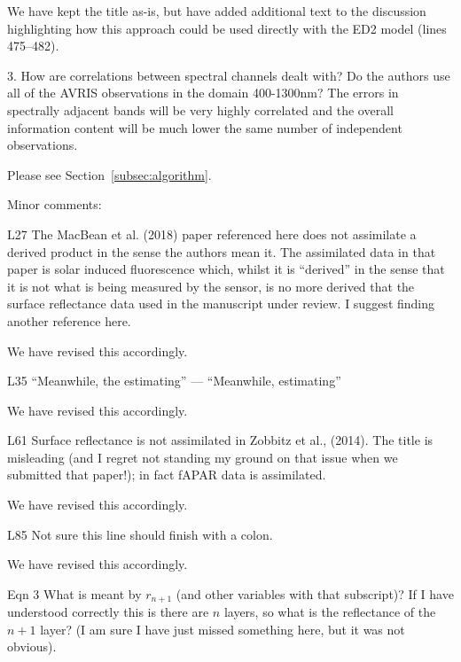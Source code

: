 We have kept the title as-is, but have added additional text to the discussion highlighting how this approach could be used directly with the ED2 model (lines 475--482).

\begin{reviewer}
  3. How are correlations between spectral channels dealt with? Do the authors use all of the AVRIS observations in the domain 400-1300nm? The errors in spectrally adjacent bands will be very highly correlated and the overall information content will be much lower the same number of independent observations.
\end{reviewer}

Please see Section~\ref{subsec:algorithm}.

\begin{reviewer}
Minor comments:

L27 The MacBean et al. (2018) paper referenced here does not assimilate a derived product in the sense the authors mean it. The assimilated data in that paper is solar induced fluorescence which, whilst it is “derived” in the sense that it is not what is being measured by the sensor, is no more derived that the surface reflectance data used in the manuscript under review. I suggest finding another reference here.
\end{reviewer}

We have revised this accordingly.

\begin{reviewer}
L35 “Meanwhile, the estimating” --- “Meanwhile, estimating”
\end{reviewer}

We have revised this accordingly.

\begin{reviewer}
L61 Surface reflectance is not assimilated in Zobbitz et al., (2014). The title is misleading (and I regret not standing my ground on that issue when we submitted that paper!); in fact fAPAR data is assimilated.
\end{reviewer}

We have revised this accordingly.

\begin{reviewer}
L85 Not sure this line should finish with a colon.
\end{reviewer}

We have revised this accordingly.

\begin{reviewer}
Eqn 3 What is meant by $r_{n+1}$ (and other variables with that subscript)? If I have understood correctly this is there are $n$ layers, so what is the reflectance of the $n + 1$ layer? (I am sure I have just missed something here, but it was not obvious).
\end{reviewer}

